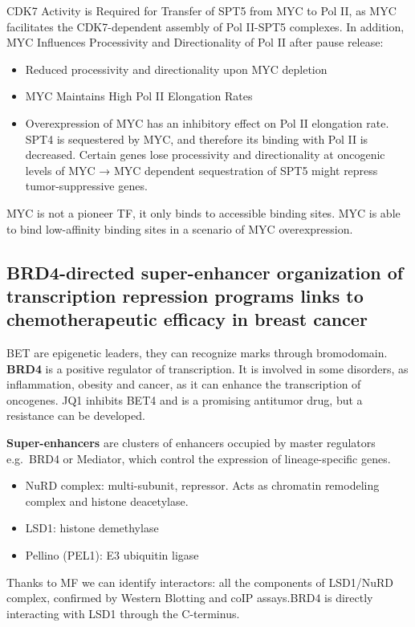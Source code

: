 CDK7 Activity is Required for Transfer of SPT5 from MYC to Pol II, as MYC facilitates the CDK7-dependent assembly of Pol II-SPT5 complexes.
In addition, MYC Influences Processivity and Directionality of Pol II after pause release:

\begin{itemize}
\tightlist
\item
  Reduced processivity and directionality upon MYC depletion
\item
  MYC Maintains High Pol II Elongation Rates
\item
  Overexpression of MYC has an inhibitory effect on Pol II elongation
  rate. SPT4 is sequestered by MYC, and therefore its binding with Pol
  II is decreased. Certain genes lose processivity and directionality at
  oncogenic levels of MYC → MYC dependent sequestration of SPT5 might
  repress tumor-suppressive genes.
\end{itemize}

MYC is not a pioneer TF, it only binds to accessible binding sites. MYC is able to bind low-affinity binding sites in a scenario of MYC overexpression.


\subsection{BRD4-directed super-enhancer organization of transcription repression programs links to chemotherapeutic efficacy in breast cancer}

BET are epigenetic leaders, they can recognize marks through
bromodomain. \textbf{BRD4} is a positive regulator of transcription. It
is involved in some disorders, as inflammation, obesity and cancer, as
it can enhance the transcription of oncogenes. JQ1 inhibits BET4 and is
a promising antitumor drug, but a resistance can be developed.

\textbf{Super-enhancers} are clusters of enhancers occupied by master
regulators e.g.~BRD4 or Mediator, which control the expression of
lineage-specific genes.

\begin{itemize}
\tightlist
\item
  NuRD complex: multi-subunit, repressor. Acts as chromatin remodeling
  complex and histone deacetylase.
\item
  LSD1: histone demethylase
\item
  Pellino (PEL1): E3 ubiquitin ligase
\end{itemize}

Thanks to MF we can identify interactors: all the components of LSD1/NuRD complex, confirmed
by Western Blotting and coIP assays.BRD4 is directly interacting with LSD1 through the C-terminus.


